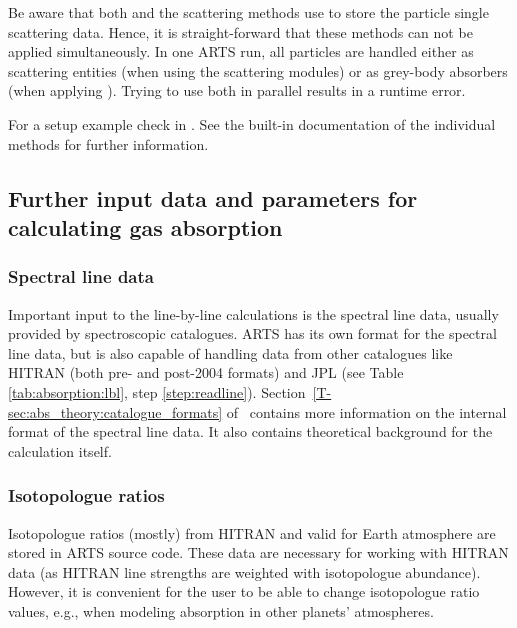Be aware that both  and the scattering methods
use  to store the particle single scattering data.
Hence, it is straight-forward that these methods can not be applied
simultaneously. In one ARTS run, all particles are handled either as scattering
entities (when using the scattering modules) or as grey-body absorbers (when
applying ). Trying to use both in
parallel results in a runtime error.

For a setup example check  in
. See the built-in
documentation of the individual methods for further information.


\subsection{Further input data and parameters for calculating gas absorption}
\label{sec:absorption:input}

\subsubsection{Spectral line data}
\label{sec:absorption:linecat}

Important input to the line-by-line calculations is the spectral line data,
usually provided by spectroscopic catalogues. ARTS has its own format for the
spectral line data, but is also capable of handling data from other catalogues
like HITRAN (both pre- and post-2004 formats) and JPL (see Table
\ref{tab:absorption:lbl}, step \ref{step:readline}).
Section~\ref{T-sec:abs_theory:catalogue_formats} of \theory\ contains more
information on the internal format of the spectral line data.  It also contains
theoretical background for the calculation itself.

\subsubsection{Isotopologue ratios}
\label{sec:absorption:isoratio}

Isotopologue ratios (mostly) from HITRAN and valid for Earth atmosphere are
stored in ARTS source code. These data are necessary for working with HITRAN data
(as HITRAN line strengths are weighted with isotopologue abundance). However,
it is convenient for the user to be able to change isotopologue ratio values,
e.g., when modeling absorption in other planets' atmospheres.

